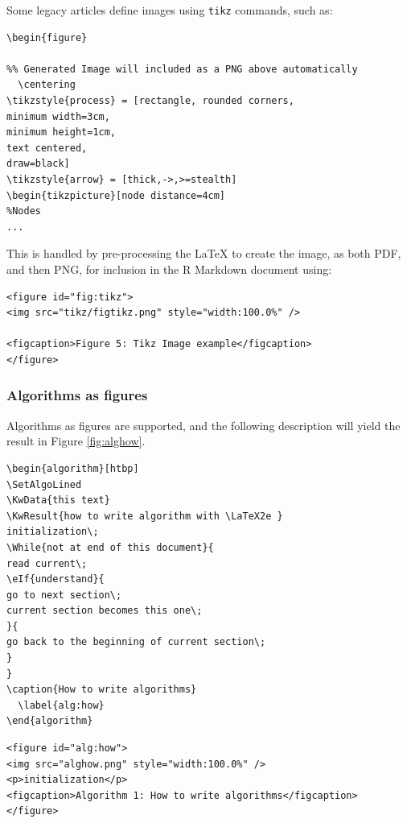 Some legacy articles define images using \texttt{tikz} commands, such as:

\begin{verbatim}
\begin{figure}

%% Generated Image will included as a PNG above automatically
  \centering
\tikzstyle{process} = [rectangle, rounded corners,
minimum width=3cm, 
minimum height=1cm,
text centered, 
draw=black]
\tikzstyle{arrow} = [thick,->,>=stealth]
\begin{tikzpicture}[node distance=4cm]
%Nodes
...
\end{verbatim}

This is handled by pre-processing the LaTeX to create the image, as both PDF, and then PNG, for inclusion in the R Markdown document using:

\begin{verbatim}
<figure id="fig:tikz">
<img src="tikz/figtikz.png" style="width:100.0%" />

<figcaption>Figure 5: Tikz Image example</figcaption>
</figure>
\end{verbatim}

\hypertarget{algorithms-as-figures}{%
\subsubsection{Algorithms as figures}\label{algorithms-as-figures}}

Algorithms as figures are supported, and the following description will yield the result in Figure \ref{fig:alghow}.

\begin{verbatim}
\begin{algorithm}[htbp]
\SetAlgoLined
\KwData{this text}
\KwResult{how to write algorithm with \LaTeX2e }
initialization\;
\While{not at end of this document}{
read current\;
\eIf{understand}{
go to next section\;
current section becomes this one\;
}{
go back to the beginning of current section\;
}
}
\caption{How to write algorithms}
  \label{alg:how}
\end{algorithm}
\end{verbatim}

\begin{verbatim}
<figure id="alg:how">
<img src="alghow.png" style="width:100.0%" />
<p>initialization</p>
<figcaption>Algorithm 1: How to write algorithms</figcaption>
</figure>
\end{verbatim}

